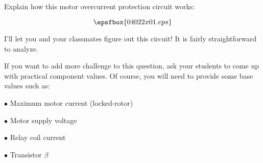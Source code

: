 

Explain how this motor overcurrent protection circuit works:

$$\epsfbox{04022x01.eps}$$







I'll let you and your classmates figure out this circuit!  It is fairly straightforward to analyze.







If you want to add more challenge to this question, ask your students to come up with practical component values.  Of course, you will need to provide some base values such as:

\medskip
\item{$\bullet$} Maximum motor current (locked-rotor)
\item{$\bullet$} Motor supply voltage
\item{$\bullet$} Relay coil current
\item{$\bullet$} Transistor $\beta$
\medskip




